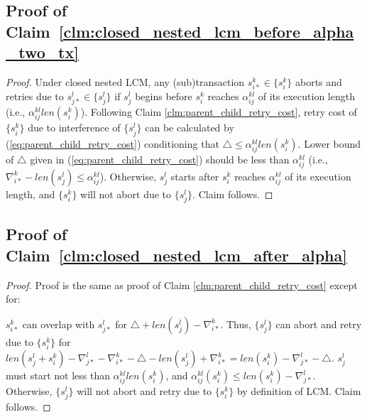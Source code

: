 \documentclass[letter]{sig-alternate}
\begin{document}
\subsection{\label{proof_clm:closed_nested_lcm_before_alpha_two_tx}Proof of Claim~\ref{clm:closed_nested_lcm_before_alpha_two_tx}}

\begin{proof}

Under closed nested LCM, any (sub)transaction $s_{i*}^{k}\in\{s_{i}^{k}\}$
aborts and retries due to $s_{j*}^{l}\in\{s_{j}^{l}\}$ if $s_{j}^{l}$
begins before $s_{i}^{k}$ reaches $\alpha_{ij}^{kl}$ of its execution
length (i.e., $\alpha_{ij}^{kl}len(s_{i}^{k})$). Following Claim
\ref{clm:parent_child_retry_cost}, retry cost of $\{s_{i}^{k}\}$
due to interference of $\{s_{j}^{l}\}$ can be calculated by (\ref{eq:parent_child_retry_cost})
conditioning that $\triangle\le\alpha_{ij}^{kl}len\left(s_{i}^{k}\right)$.
Lower bound of $\triangle$ given in (\ref{eq:parent_child_retry_cost})
should be less than $\alpha_{ij}^{kl}$ (i.e., $\nabla_{i*}^{k}-len\left(s_{j}^{l}\right)\le\alpha_{ij}^{kl}$).
Otherwise, $s_{j}^{l}$ starts after $s_{i}^{k}$ reaches $\alpha_{ij}^{kl}$
of its execution length, and $\{s_{i}^{k}\}$ will not abort due to
$\{s_{j}^{l}\}$. Claim follows.

\end{proof}

\subsection{\label{proof_clm:closed_nested_lcm_after_alpha}Proof of Claim~\ref{clm:closed_nested_lcm_after_alpha}}

\begin{proof}

Proof is the same as proof of Claim \ref{clm:parent_child_retry_cost}
except for:

$s_{i*}^{k}$ can overlap with $s_{j*}^{l}$ for $\triangle+len\left(s_{j}^{l}\right)-\nabla_{i*}^{k}$.
Thus, $\{s_{j}^{l}\}$ can abort and retry due to $\{s_{i}^{k}\}$
for $len\left(s_{j}^{l}+s_{i}^{k}\right)-\nabla_{j*}^{l}-\nabla_{i*}^{k}-\triangle-len\left(s_{j}^{l}\right)+\nabla_{i*}^{k}=len\left(s_{i}^{k}\right)-\nabla_{j*}^{l}-\triangle$.
$s_{j}^{l}$ must start not less than $\alpha_{ij}^{kl}len\left(s_{i}^{k}\right)$,
and $\alpha_{ij}^{kl}\left(s_{i}^{k}\right)\le len\left(s_{i}^{k}\right)-\nabla_{j*}^{l}$.
Otherwise, $\{s_{j}^{l}\}$ will not abort and retry due to $\{s_{i}^{k}\}$
by definition of LCM. Claim follows.

\end{proof}
\end{document}
